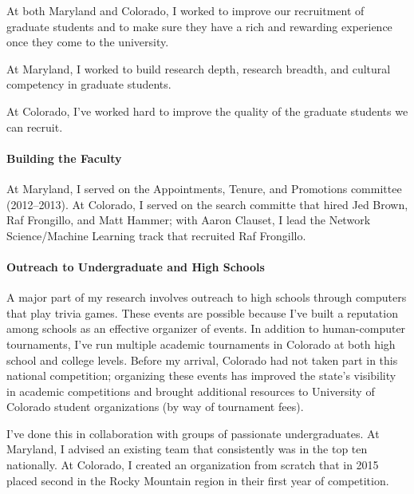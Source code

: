 \documentclass[11pt]{amsart}
\begin{document}
At both Maryland and Colorado, I worked to improve our recruitment of graduate
students and to make sure they have a rich and rewarding experience once they
come to the university.

At Maryland, I worked to build research depth, research breadth, and cultural
competency in graduate students.

At Colorado, I've worked hard to improve the quality of the graduate students we
can recruit.

\paragraph{Building the Faculty}

At Maryland, I served on the  Appointments, Tenure, and Promotions
committee (2012--2013).  At Colorado, I served on the search committe that
hired Jed Brown, Raf Frongillo, and Matt Hammer; with Aaron Clauset, I lead the
Network Science/Machine Learning track that recruited Raf Frongillo.

\paragraph{Outreach to Undergraduate and High Schools}

A major part of my research involves outreach to high schools through computers
that play trivia games.  These events are possible because I've built a
reputation among schools as an effective organizer of events.  In addition to
human-computer tournaments, I've run multiple academic tournaments in Colorado
at both high school and college levels.  Before my arrival, Colorado had not
taken part in this national competition; organizing these events has improved
the state's visibility in academic competitions and brought additional resources
to University of Colorado student organizations (by way of tournament fees).

I've done this in collaboration with groups of passionate undergraduates.  At
Maryland, I advised an existing team that consistently was in the top ten
nationally.  At Colorado, I created an organization from scratch that in 2015
placed second in the Rocky Mountain region in their first year of competition.


%
%
\end{document}
